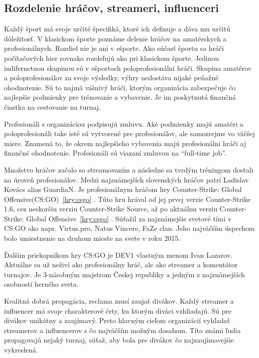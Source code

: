 \documentclass[10pt,oneside,slovak,a4paper]{article}
\begin{document}
\subsection{Rozdelenie hráčov, streameri, influenceri} \label{klasifikacia:rozdelenie}

Každý šport má svoje určité špecifiká, ktoré ich definuje a dáva mu určitú dôležitosť. V klasickom športe poznáme delenie hráčov na amatérskych a profesionálnych. Rozdiel nie je ani v ešporte. Ako súčasť športu sa hráči počítačových hier rovnako rozdeľujú ako pri klasickom športe. Jedinou indifernetnou skupinou sú v ešportoch poloprofesionálni hráči. 
Skupina amatérov a poloprofesionálov za svoje výsledky, výhry nedostáva nijaké peňažné ohodnotenie. Sú to najmä vášnivý hráči, ktorým organizácia zabezpečuje čo najlepšie podmienky pre trénovanie a vybavenie. Je im poskytnutá finančná čiastka na cestovanie na turnaj. 

Profesionáli s organizáciou podpisujú zmluvu. Aké podmienky majú amatéri a poloprofesionáli take isté sú vytvorené pre profesionálov, ale samozrejme vo väčšej miere. Znamená to, že okrem najlepšieho vybavenia majú profesionálni hráči aj finančné ohodnotenie. Profesionáli sú viazaní zmluvou na “full-time job”.\cite{a1}

Množstvo hráčov začalo so streamovaním a následne sa tvrdým tréningom dostali na úroveň profesionálov. Medzi najznámejších slovenských hráčov patrí Ladislav Kovács alias GuardiaN. Je profesionálnym hráčom hry Counter-Strike: Global Offensive(CS:GO)~\ref{hry:csgo} . Túto hru hrával od jej prvej verzie Counter-Strike 1.6, cez neskoršiu verziu Counter-Strike Source, až po aktuálnu verziu Counter-Strike: Global Offensive~\ref{hry:csgo} . Súťažil za najznámejšie svetové tími v CS:GO ako napr. Virtus.pro, Natus Vincere, FaZe clan. Jeho najväčším úspechom bolo umiestnenie na druhom mieste na svete v roku 2015.

Ďalším priekopníkom hry CS:GO je DEV1 vlastným menom Ivan Lazarov. Aktuálne sa už neživí ako profesionálny hráč, ale ako streamer a komentátor turnajov. Je 3-násobným majstrom Českej republiky a jedným z najznámejších osobností herného sveta.\cite{a6}

Kvalitná dobrá propagácia, reclama musí zaujať divákov. Každý streamer a influencer má svoje charakterové črty, ku ktorým diváci vzhliadajú. Sú pre divákov unikátny a zaujímavý. Preto hlavným cieľom organizácií vyhľadať streamerov a influencerov s čo najväčším možným dosahom. Títo známi ľudia propagovajú nejaký turnaj, súťaž, aby bola pre divákov čo najzaujímavejšie vykreslená.\cite{a1}
\end{document}
